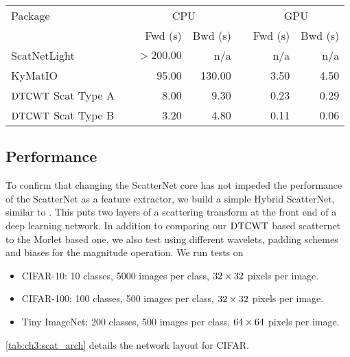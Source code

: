 \begin{table}
  \renewcommand{\arraystretch}{1.2}
  \centering
  \begin{tabular}{@{}lcrrcrr}
    \toprule
    Package &\phantom{ab} & \multicolumn{2}{c}{CPU} && \multicolumn{2}{c}{GPU} \\\cline{3-4}\cline{6-7}
    && Fwd (s) & Bwd (s) && Fwd (s) & Bwd (s) \\\midrule
    ScatNetLight\cite{oyallon_deep_2015}&& $>200.00$ & n/a && n/a & n/a \\
    KyMatIO\cite{andreux_kymatio:_2018}&& 95.00 & 130.00 && 3.50& 4.50 \\
    $\mathrm{DT}\mathbb{C}\mathrm{WT}$ Scat Type A && 8.00 & 9.30 && 0.23 & 0.29 \\
    $\mathrm{DT}\mathbb{C}\mathrm{WT}$ Scat Type B && 3.20 & 4.80 && 0.11 & 0.06 \\\bottomrule
  \end{tabular}\label{tab:ch3:scat_speeds}
\end{table}

\subsection{Performance}
To confirm that changing the ScatterNet core has not impeded the
performance of the ScatterNet as a feature extractor, we build a simple Hybrid
ScatterNet, similar to \cite{oyallon_hybrid_2017, oyallon_scaling_2017}. This
puts two layers of a scattering transform at the front end of a deep learning
network. In addition to comparing our $\mathrm{DT}\mathbb{C}\mathrm{WT}$ based
scatternet to the Morlet based one, we also test using different wavelets,
padding schemes and biases for the magnitude operation. 
We run tests on 
\begin{itemize}
  \item CIFAR-10: 10 classes, 5000 images per class, $32\times 32$ pixels per image.
  \item CIFAR-100: 100 classes, 500 images per class, $32\times 32$ pixels per image. 
  \item Tiny ImageNet\cite{li_tiny_2017}: 200 classes, 500 images per class, 
    $64 \times 64$ pixels per image. 
\end{itemize}
\autoref{tab:ch3:scat_arch} details the network layout for CIFAR. 

